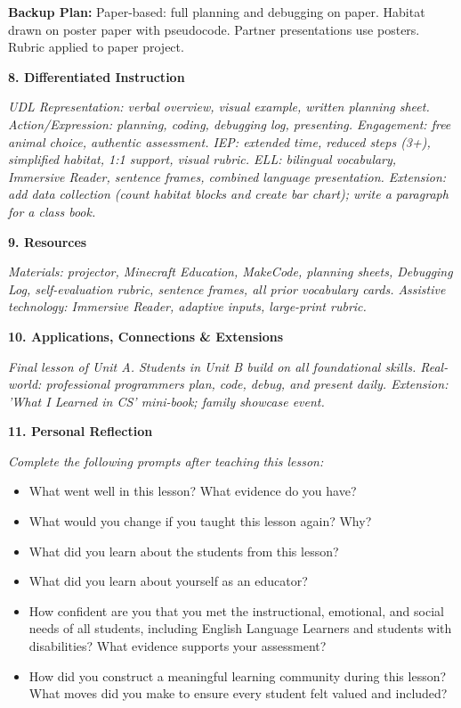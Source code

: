\documentclass[11pt,letterpaper]{article}
\begin{document}
\textbf{Backup Plan: }Paper-based: full planning and debugging on paper. Habitat drawn on poster paper with pseudocode. Partner presentations use posters. Rubric applied to paper project.

\textbf{8. Differentiated Instruction}

\textit{UDL Representation: verbal overview, visual example, written planning sheet. Action/Expression: planning, coding, debugging log, presenting. Engagement: free animal choice, authentic assessment. IEP: extended time, reduced steps (3+), simplified habitat, 1:1 support, visual rubric. ELL: bilingual vocabulary, Immersive Reader, sentence frames, combined language presentation. Extension: add data collection (count habitat blocks and create bar chart); write a paragraph for a class book.}

\newpage
\textbf{9. Resources}

\textit{Materials: projector, Minecraft Education, MakeCode, planning sheets, Debugging Log, self-evaluation rubric, sentence frames, all prior vocabulary cards. Assistive technology: Immersive Reader, adaptive inputs, large-print rubric.}

\textbf{10. Applications, Connections \& Extensions}

\textit{Final lesson of Unit A. Students in Unit B build on all foundational skills. Real-world: professional programmers plan, code, debug, and present daily. Extension: 'What I Learned in CS' mini-book; family showcase event.}

\textbf{11. Personal Reflection}

\textit{Complete the following prompts after teaching this lesson:}

\begin{itemize}
  \item What went well in this lesson? What evidence do you have?

  \item What would you change if you taught this lesson again? Why?

  \item What did you learn about the students from this lesson?

  \item What did you learn about yourself as an educator?

  \item How confident are you that you met the instructional, emotional, and social needs of all students, including English Language Learners and students with disabilities? What evidence supports your assessment?

  \item How did you construct a meaningful learning community during this lesson? What moves did you make to ensure every student felt valued and included?
\end{itemize}
\end{document}
